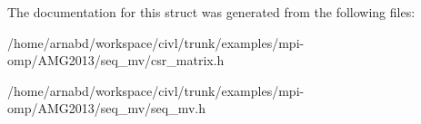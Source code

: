 The documentation for this struct was generated from the following files\+:\begin{DoxyCompactItemize}
\item 
/home/arnabd/workspace/civl/trunk/examples/mpi-\/omp/\+A\+M\+G2013/seq\+\_\+mv/csr\+\_\+matrix.\+h\item 
/home/arnabd/workspace/civl/trunk/examples/mpi-\/omp/\+A\+M\+G2013/seq\+\_\+mv/seq\+\_\+mv.\+h\end{DoxyCompactItemize}
